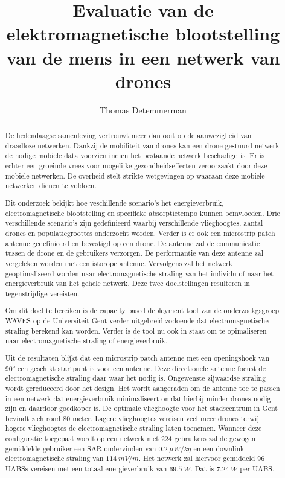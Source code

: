 \documentclass[twocolumn]{phdsymp_dutch}
\begin{document}
\title{	Evaluatie van de elektromagnetische blootstelling van de mens in een netwerk van drones}

\author{Thomas Detemmerman}


\maketitle

\begin{abstract}

De hedendaagse samenleving vertrouwt meer dan ooit op de aanwezigheid van draadloze netwerken. 
Dankzij de mobiliteit van  drones kan een drone-gestuurd netwerk de nodige mobiele data voorzien 
indien het bestaande netwerk beschadigd is.
Er is echter een groeinde vrees voor mogelijke gezondheidseffecten veroorzaakt door deze
mobiele netwerken. De overheid stelt strikte wetgevingen op waaraan deze mobiele netwerken dienen te voldoen.

Dit onderzoek bekijkt hoe veschillende scenario's het energieverbruik, electromagnetische blootstelling en 
specifieke absorptietempo kunnen be\"invloeden.
Drie verschillende scenario's zijn gedefinieerd waarbij verschillende vlieghoogtes, aantal drones en 
populatiegroottes onderzocht worden.
Verder is er ook een microstrip patch antenne gedefinieerd en bevestigd op een drone. 
De antenne zal de communicatie tussen de drone en de gebruikers verzorgen.
De performantie van deze antenne zal vergeleken worden met een istorope antenne.
Vervolgens zal het netwerk geoptimaliseerd worden naar electromagnetische straling van het individu of 
naar het energieverbruik van het gehele netwerk. Deze twee doelstellingen resulteren in 
tegenstrijdige vereisten. 

Om dit doel te bereiken is de capacity based deployment tool van de onderzoekgsgroep WAVES op de 
Universiteit Gent verder uitgebreid zodoende dat electromagnetische straling berekend kan worden.
Verder is de tool nu ook in staat om te opimaliseren naar electromagnetische straling of energieverbruik. 

Uit de resultaten blijkt dat een microstrip patch antenne
met een openingshoek van \ang{90} een geschikt startpunt is voor een antenne.
Deze directionele  antenne focust de electromagnetische straling daar waar het nodig is.
Ongewenste zijwaardse straling wordt gereduceerd door het design.
Het wordt aangeraden om de antenne toe te passen in een netwerk dat energieverbruik minimaliseert
omdat hierbij minder drones nodig zijn en daardoor goedkoper is.
De optimale vlieghoogte voor het stadscentrum in Gent bevindt zich rond 80  meter.
Lagere vlieghoogtes vereisen veel meer drones terwijl hogere vlieghoogtes de 
electromagnetische straling laten toenemen.
Wanneer deze configuratie toegepast wordt op een netwerk met 224 gebruikers zal de gewogen gemiddelde gebruiker 
een SAR ondervinden van  $0.2\ \mu W/kg$ en een downlink electromagnetische straling van 
$114\ mV/m$. Het netwerk zal hiervoor gemiddeld 96 UABSs vereisen met een totaal energieverbruik 
van $69.5\ W$. Dat is $7.24\ W$ per UABS.
  
\end{abstract}
\end{document}
